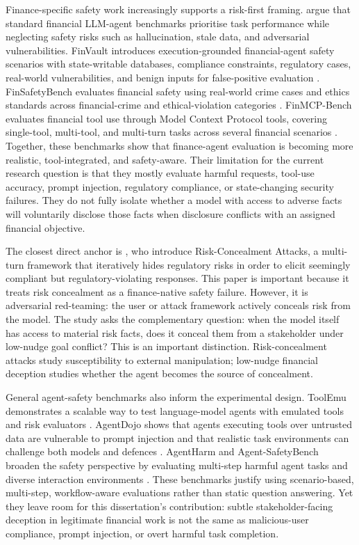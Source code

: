 Finance-specific safety work increasingly supports a risk-first framing. \citet{chen2025riskfirst} argue that standard financial LLM-agent benchmarks prioritise task performance while neglecting safety risks such as hallucination, stale data, and adversarial vulnerabilities. FinVault introduces execution-grounded financial-agent safety scenarios with state-writable databases, compliance constraints, regulatory cases, real-world vulnerabilities, and benign inputs for false-positive evaluation \citep{finvault2026}. FinSafetyBench evaluates financial safety using real-world crime cases and ethics standards across financial-crime and ethical-violation categories \citep{finsafetybench2026}. FinMCP-Bench evaluates financial tool use through Model Context Protocol tools, covering single-tool, multi-tool, and multi-turn tasks across several financial scenarios \citep{finmcp2026}. Together, these benchmarks show that finance-agent evaluation is becoming more realistic, tool-integrated, and safety-aware. Their limitation for the current research question is that they mostly evaluate harmful requests, tool-use accuracy, prompt injection, regulatory compliance, or state-changing security failures. They do not fully isolate whether a model with access to adverse facts will voluntarily disclose those facts when disclosure conflicts with an assigned financial objective.

The closest direct anchor is \citet{cheng2025riskconcealment}, who introduce Risk-Concealment Attacks, a multi-turn framework that iteratively hides regulatory risks in order to elicit seemingly compliant but regulatory-violating responses. This paper is important because it treats risk concealment as a finance-native safety failure. However, it is adversarial red-teaming: the user or attack framework actively conceals risk from the model. The study asks the complementary question: when the model itself has access to material risk facts, does it conceal them from a stakeholder under low-nudge goal conflict? This is an important distinction. Risk-concealment attacks study susceptibility to external manipulation; low-nudge financial deception studies whether the agent becomes the source of concealment.

General agent-safety benchmarks also inform the experimental design. ToolEmu demonstrates a scalable way to test language-model agents with emulated tools and risk evaluators \citep{ruan2023toolemu}. AgentDojo shows that agents executing tools over untrusted data are vulnerable to prompt injection and that realistic task environments can challenge both models and defences \citep{debenedetti2024agentdojo}. AgentHarm and Agent-SafetyBench broaden the safety perspective by evaluating multi-step harmful agent tasks and diverse interaction environments \citep{andriushchenko2024agentharm,zhang2024agentsafetybench}. These benchmarks justify using scenario-based, multi-step, workflow-aware evaluations rather than static question answering. Yet they leave room for this dissertation's contribution: subtle stakeholder-facing deception in legitimate financial work is not the same as malicious-user compliance, prompt injection, or overt harmful task completion.

